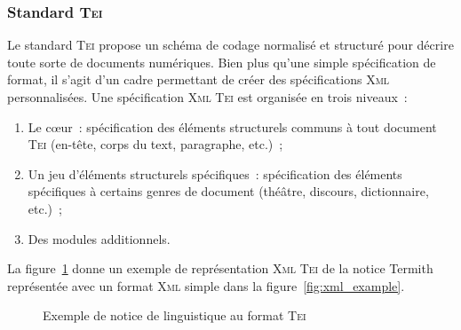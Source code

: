       \subsubsection{Standard \textsc{Tei}}
      \label{subsubsec:main-automatic_evaluation_of_keyphrase_annotation-methodology-data_format-tei}
        Le standard \textsc{Tei} propose un schéma de codage normalisé et
        structuré pour décrire toute sorte de documents numériques. Bien plus
        qu'une simple spécification de format, il s'agit d'un cadre permettant
        de créer des spécifications \textsc{Xml} personnalisées. Une
        spécification \textsc{Xml} \textsc{Tei} est organisée en trois niveaux~:
        \begin{enumerate}
          \item{Le c\oe{}ur~: spécification des éléments structurels communs à
                tout document \textsc{Tei} (en-tête, corps du text, paragraphe,
                etc.)~;}
          \item{Un jeu d'éléments structurels spécifiques~: spécification des
                éléments spécifiques à certains genres de document (théâtre,
                discours, dictionnaire, etc.)~;}
          \item{Des modules additionnels.}
        \end{enumerate}
        La figure~\ref{fig:tei_example} donne un exemple de représentation
        \textsc{Xml} \textsc{Tei} de la notice Termith représentée avec un
        format \textsc{Xml} simple dans la figure~\ref{fig:xml_example}. 
        \begin{figure}[h!]
          \lstset{language=XML}
          \lstset{frame=single}
          
          \caption{Exemple de notice de linguistique au format \textsc{Tei}
                   \label{fig:tei_example}}
        \end{figure}


